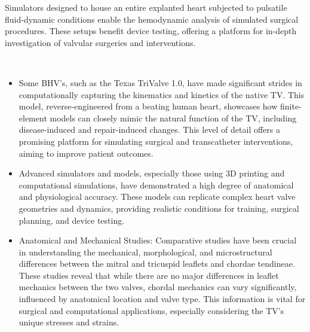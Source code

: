 Simulators designed to house an entire explanted heart subjected to pulsatile fluid-dynamic conditions enable the hemodynamic analysis of simulated surgical procedures. These setups benefit device testing, offering a platform for in-depth investigation of valvular surgeries and interventions. ~


\\
\begin{itemize}
    \item Some \gls{BHV}'s, such as the Texas TriValve 1.0, have made significant strides in computationally capturing the kinematics and kinetics of the native \gls{TV}. This model, reverse-engineered from a beating human heart, showcases how finite-element models can closely mimic the natural function of the \gls{TV}, including disease-induced and repair-induced changes. This level of detail offers a promising platform for simulating surgical and transcatheter interventions, aiming to improve patient outcomes. ~
    \item Advanced simulators and models, especially those using 3D printing and computational simulations, have demonstrated a high degree of anatomical and physiological accuracy. These models can replicate complex heart valve geometries and dynamics, providing realistic conditions for training, surgical planning, and device testing. ~

    \item Anatomical and Mechanical Studies: Comparative studies have been crucial in understanding the mechanical, morphological, and microstructural differences between the mitral and tricuspid leaflets and chordae tendineae. These studies reveal that while there are no major differences in leaflet mechanics between the two valves, chordal mechanics can vary significantly, influenced by anatomical location and valve type. This information is vital for surgical and computational applications, especially considering the \gls{TV}'s unique stresses and strains. ~
\end{itemize}

